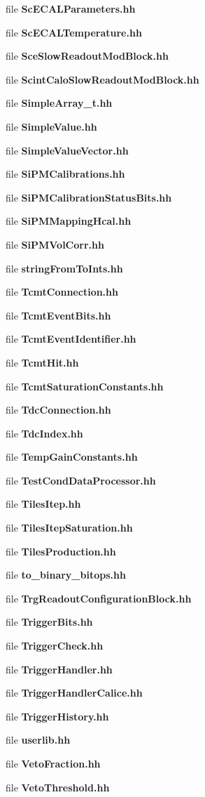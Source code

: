 \begin{DoxyCompactItemize}
\item 
file {\bfseries Sc\-E\-C\-A\-L\-Parameters.\-hh}
\item 
file {\bfseries Sc\-E\-C\-A\-L\-Temperature.\-hh}
\item 
file {\bfseries Sce\-Slow\-Readout\-Mod\-Block.\-hh}
\item 
file {\bfseries Scint\-Calo\-Slow\-Readout\-Mod\-Block.\-hh}
\item 
file {\bfseries Simple\-Array\-\_\-t.\-hh}
\item 
file {\bfseries Simple\-Value.\-hh}
\item 
file {\bfseries Simple\-Value\-Vector.\-hh}
\item 
file {\bfseries Si\-P\-M\-Calibrations.\-hh}
\item 
file {\bfseries Si\-P\-M\-Calibration\-Status\-Bits.\-hh}
\item 
file {\bfseries Si\-P\-M\-Mapping\-Hcal.\-hh}
\item 
file {\bfseries Si\-P\-M\-Vol\-Corr.\-hh}
\item 
file {\bfseries string\-From\-To\-Ints.\-hh}
\item 
file {\bfseries Tcmt\-Connection.\-hh}
\item 
file {\bfseries Tcmt\-Event\-Bits.\-hh}
\item 
file {\bfseries Tcmt\-Event\-Identifier.\-hh}
\item 
file {\bfseries Tcmt\-Hit.\-hh}
\item 
file {\bfseries Tcmt\-Saturation\-Constants.\-hh}
\item 
file {\bfseries Tdc\-Connection.\-hh}
\item 
file {\bfseries Tdc\-Index.\-hh}
\item 
file {\bfseries Temp\-Gain\-Constants.\-hh}
\item 
file {\bfseries Test\-Cond\-Data\-Processor.\-hh}
\item 
file {\bfseries Tiles\-Itep.\-hh}
\item 
file {\bfseries Tiles\-Itep\-Saturation.\-hh}
\item 
file {\bfseries Tiles\-Production.\-hh}
\item 
file {\bfseries to\-\_\-binary\-\_\-bitops.\-hh}
\item 
file {\bfseries Trg\-Readout\-Configuration\-Block.\-hh}
\item 
file {\bfseries Trigger\-Bits.\-hh}
\item 
file {\bfseries Trigger\-Check.\-hh}
\item 
file {\bfseries Trigger\-Handler.\-hh}
\item 
file {\bfseries Trigger\-Handler\-Calice.\-hh}
\item 
file {\bfseries Trigger\-History.\-hh}
\item 
file {\bfseries userlib.\-hh}
\item 
file {\bfseries Veto\-Fraction.\-hh}
\item 
file {\bfseries Veto\-Threshold.\-hh}
\end{DoxyCompactItemize}
